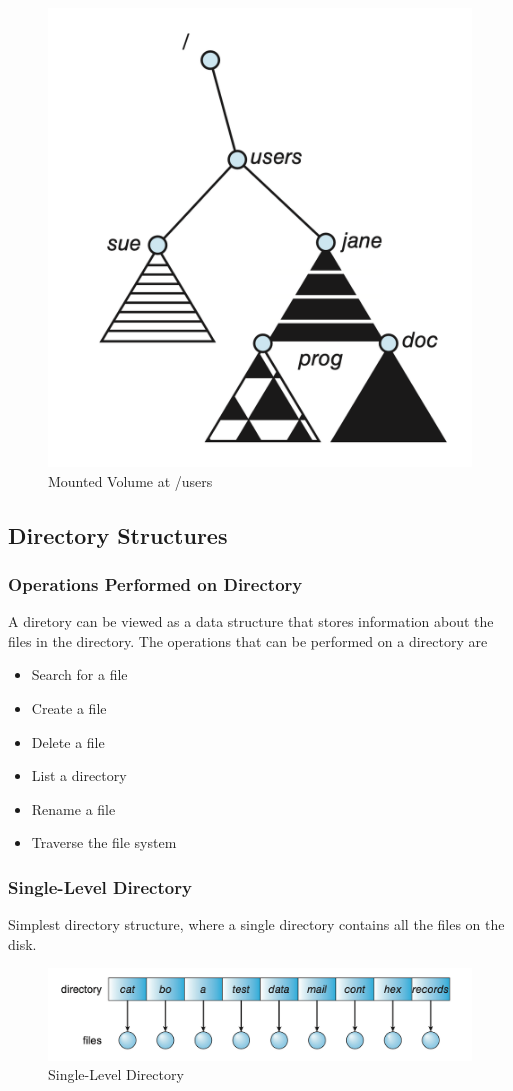 \documentclass{book/custombook}
\begin{document}
                        \begin{figure}[H]
                            \centering
                            \includegraphics[width=0.3\linewidth]{figures/mounted_volume.png}
                            \caption{Mounted Volume at /users}
                        \end{figure}
                \subsection{Directory Structures}
                    \subsubsection{Operations Performed on Directory}
                            A diretory can be viewed as a data structure that stores information about the files in the directory.
                            The operations that can be performed on a directory are
                            \begin{itemize}
                                \item Search for a file
                                \item Create a file
                                \item Delete a file
                                \item List a directory
                                \item Rename a file
                                \item Traverse the file system
                            \end{itemize}
                    \subsubsection{Single-Level Directory}
                        Simplest directory structure, where a single directory contains all the files on the disk.\\
                        \begin{figure}[H]
                            \centering
                            \includegraphics[width=0.6\linewidth]{figures/single_level_dir.png}
                            \caption{Single-Level Directory}
                        \end{figure}
\end{document}
